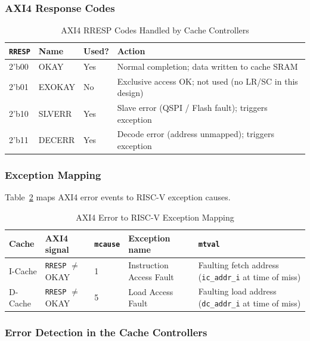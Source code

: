 \subsubsection{AXI4 Response Codes}

\begin{table}[H]
\caption{AXI4 RRESP Codes Handled by Cache Controllers}
\label{tab:asRresp}
\centering
\begin{tabularx}{\textwidth}{|l |l |l |X|}
  \hline
  \texttt{RRESP} & Name & Used? & Action \\
  \hline
  \hline
  2'b00 & OKAY   & Yes & Normal completion; data written to cache SRAM \\
  \hline
  2'b01 & EXOKAY & No  & Exclusive access OK; not used (no LR/SC in this design) \\
  \hline
  2'b10 & SLVERR & Yes & Slave error (QSPI / Flash fault); triggers exception \\
  \hline
  2'b11 & DECERR & Yes & Decode error (address unmapped); triggers exception \\
  \hline
\end{tabularx}
\end{table}

\subsubsection{Exception Mapping}

Table~\ref{tab:asAxi4Exc} maps AXI4 error events to RISC-V exception
causes.

\begin{table}[H]
\caption{AXI4 Error to RISC-V Exception Mapping}
\label{tab:asAxi4Exc}
\centering
\begin{tabularx}{\textwidth}{|l |l |l |X |X|}
  \hline
  Cache & AXI4 signal & \texttt{mcause} & Exception name & \texttt{mtval} \\
  \hline
  \hline
  I-Cache & \texttt{RRESP} $\neq$ OKAY & 1 & Instruction Access Fault &
    Faulting fetch address (\texttt{ic\_addr\_i} at time of miss) \\
  \hline
  D-Cache & \texttt{RRESP} $\neq$ OKAY & 5 & Load Access Fault &
    Faulting load address (\texttt{dc\_addr\_i} at time of miss) \\
  \hline
\end{tabularx}
\end{table}

\subsubsection{Error Detection in the Cache Controllers}

